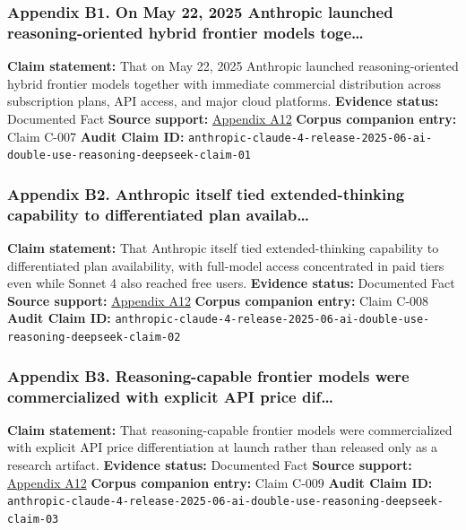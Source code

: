 \documentclass[
  american,
  11pt,
  letterpaper,
]{article}
\begin{document}
\subsubsection{Appendix B1. On May 22, 2025 Anthropic launched
reasoning-oriented hybrid frontier models
toge\ldots{}}\label{ch-06-appendix-b1-on-may-22-2025-anthropic-launched-reasoning-oriented-hybrid-frontier-models-toge}

\textbf{Claim statement:} That on May 22, 2025 Anthropic launched
reasoning-oriented hybrid frontier models together with immediate
commercial distribution across subscription plans, API access, and major
cloud platforms. \textbf{Evidence status:} Documented Fact
\textbf{Source support:}
\hyperref[ch-06-appendix-a12-introducing-claude-4]{Appendix A12}
\textbf{Corpus companion entry:} Claim C-007 \textbf{Audit Claim ID:}
\texttt{anthropic-claude-4-release-2025-06-ai-double-use-reasoning-deepseek-claim-01}

\subsubsection{Appendix B2. Anthropic itself tied extended-thinking
capability to differentiated plan
availab\ldots{}}\label{ch-06-appendix-b2-anthropic-itself-tied-extended-thinking-capability-to-differentiated-plan-availab}

\textbf{Claim statement:} That Anthropic itself tied extended-thinking
capability to differentiated plan availability, with full-model access
concentrated in paid tiers even while Sonnet 4 also reached free users.
\textbf{Evidence status:} Documented Fact \textbf{Source support:}
\hyperref[ch-06-appendix-a12-introducing-claude-4]{Appendix A12}
\textbf{Corpus companion entry:} Claim C-008 \textbf{Audit Claim ID:}
\texttt{anthropic-claude-4-release-2025-06-ai-double-use-reasoning-deepseek-claim-02}

\subsubsection{Appendix B3. Reasoning-capable frontier models were
commercialized with explicit API price
dif\ldots{}}\label{ch-06-appendix-b3-reasoning-capable-frontier-models-were-commercialized-with-explicit-api-price-dif}

\textbf{Claim statement:} That reasoning-capable frontier models were
commercialized with explicit API price differentiation at launch rather
than released only as a research artifact. \textbf{Evidence status:}
Documented Fact \textbf{Source support:}
\hyperref[ch-06-appendix-a12-introducing-claude-4]{Appendix A12}
\textbf{Corpus companion entry:} Claim C-009 \textbf{Audit Claim ID:}
\texttt{anthropic-claude-4-release-2025-06-ai-double-use-reasoning-deepseek-claim-03}
\end{document}
